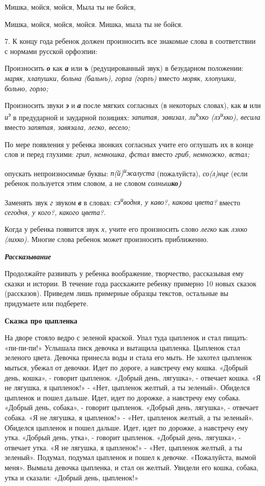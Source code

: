 \documentclass[a5paper]{book}
\renewcommand{\emph}[1]{\textit{#1}}
\begin{document}
Мишка, мойся, мойся, Мыла ты не бойся,

Мишка, мойся, мойся, мойся. Мишка, мыла ты не бойся.

7. К концу года ребенок должен произносить все знакомые слова в
соответствии с нормами русской орфоэпии:

Произносить \emph{\textbf{о}} как \emph{\textbf{а}} или
\emph{\textbf{ъ}} (редуцированный звук) в безударном положении:
\emph{маряк, хлапушки, больна (бальнъ), горла (горлъ)} вместо
\emph{моряк, хлопушки, больно, горло;}

Произносить звуки \emph{\textbf{э}} и \emph{\textbf{а}} после мягких
согласных (в некоторых словах), как \emph{\textbf{и}} или
\emph{и\textsuperscript{э}} в предударной и заударной позициях:
\emph{запитая, завизал, ли\textsuperscript{ъ}хко
(лэ\textsuperscript{и}хко), весила} вместо \emph{запятая, завязала,
легко, весело;}

По мере появления у ребенка звонких согласных учите его оглушать их в
конце слов и перед глухими: \emph{грип, немношка, фстал} вместо
\emph{гриб, немножко, встал;}

опускать непроизносимые буквы: \emph{п(й)\textsuperscript{и}жалуста}
(пожалуйста), \emph{со(л)нце} (если ребенок пользуется этим словом, а не
словом \emph{солныш\textbf{ко)}}

Заменять звук \emph{г} звуком \emph{\textbf{в}} в словах:
\emph{сэ\textsuperscript{и}водня, у каво?, какова цвета?} вместо
\emph{сегодня, у кого?, какого цвета?.}

Когда у ребенка появится звук \emph{х,} учите его произносить слово
\emph{легко} как \emph{лэхко (лихко).} Многие слова ребенок может
произносить приближенно.

\emph{\textbf{Рассказывание}}

Продолжайте развивать у ребенка воображение, творчество, рассказывая ему
сказки и истории. В течение года расскажите ребенку примерно 10 новых
сказок (рассказов). Приведем лишь примерные образцы текстов, остальные
вы придумаете или подберете.

\textbf{Сказка про цыпленка}

На дворе стояло ведро с зеленой краской. Упал туда цыпленок и стал
пищать: «пи-пи-пи!» Услышала писк девочка и вытащила цыпленка. Цыпленок
стал зеленого цвета. Девочка принесла воды и стала его мыть. Не захотел
цыпленок мыться, убежал от девочки. Идет по дороге, а навстречу ему
кошка. «Добрый день, кошка», - говорит цыпленок. «Добрый день, лягушка»,
- отвечает кошка. «Я не лягушка, я цыпленок!» - «Нет, цыпленок желтый, а
ты зеленый». Обиделся цыпленок и пошел дальше. Идет, идет по дорожке, а
навстречу ему собака. «Добрый день, собака», - говорит цыпленок. «Добрый
день, лягушка», - отвечает собака. «Я не лягушка, я цыпленок!» - «Нет,
цыпленок желтый, а ты зеленый». Обиделся цыпленок и пошел дальше. Идет,
идет по дорожке, а навстречу ему утка. «Добрый день, утка», - говорит
цыпленок. «Добрый день, лягушка», - отвечает утка. «Я не лягушка, я
цыпленок!» - «Нет, цыпленок желтый, а ты зеленый». Подумал, подумал
цыпленок и пошел к девочке. «Пожалуйста, вымой меня». Вымыла девочка
цыпленка, и стал он желтый. Увидели его кошка, собака, утка и сказали:
«Добрый день, цыпленок!»
\end{document}
